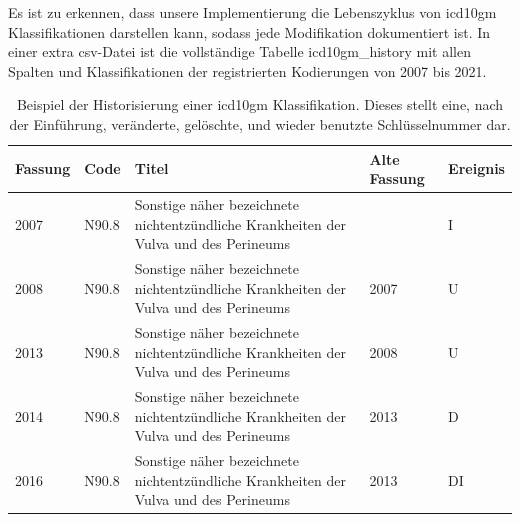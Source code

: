 Es ist zu erkennen, dass unsere Implementierung die Lebenszyklus von \ac{icd10gm} Klassifikationen darstellen kann, sodass jede Modifikation dokumentiert ist. In einer extra \ac{csv}-Datei ist die vollständige Tabelle \textsf{icd10gm\_history} mit allen Spalten und Klassifikationen der registrierten Kodierungen von 2007 bis 2021.

\clearpage

\begin{table}[ht]
	\centering
	\small
	\caption[Beispiel der Historisierung einer \acs{icd10gm} Klassifikation]{Beispiel der Historisierung einer \acs{icd10gm} Klassifikation. Dieses stellt eine, nach der Einführung, veränderte, gelöschte, und wieder benutzte Schlüsselnummer dar.}
	\label{tab:IUDDI}
	\begin{tabular}{|l|l|p{6cm}|l|l|}
		\hline
		\rowcolor{lightgray} Fassung & Code & Titel & Alte Fassung & Ereignis \\ \hline
			2007 & N90.8  & Sonstige näher bezeichnete nichtentzündliche Krankheiten der Vulva und des Perineums &  & I \\ \hline
			2008 & N90.8  & Sonstige näher bezeichnete nichtentzündliche Krankheiten der Vulva und des Perineums & 2007 & U \\ \hline
			2013 & N90.8  & Sonstige näher bezeichnete nichtentzündliche Krankheiten der Vulva und des Perineums & 2008 & U \\ \hline
			2014 & N90.8  & Sonstige näher bezeichnete nichtentzündliche Krankheiten der Vulva und des Perineums & 2013 & D \\ \hline
			2016 & N90.8  & Sonstige näher bezeichnete nichtentzündliche Krankheiten der Vulva und des Perineums & 2013 & DI \\ \hline
	\end{tabular}
\end{table}

